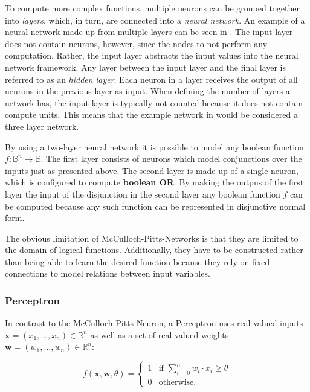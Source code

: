 To compute more complex functions, multiple neurons can be grouped together into \textit{layers}, which, in turn, are connected into a \textit{neural network}.
An example of a neural network made up from multiple layers can be seen in .
The input layer does not contain neurons, however, since the nodes to not perform any computation.
Rather, the input layer abstracts the input values into the neural network framework.
Any layer between the input layer and the final layer is referred to as an \textit{hidden layer}.
Each neuron in a layer receives the output of all neurons in the previous layer as input.
When defining the number of layers a network has, the input layer is typically not counted because it does not contain compute units.
This means that the example network in  would be considered a three layer network.

By using a two-layer neural network it is possible to model any boolean function $f: \mathbb{B}^n \to \mathbb{B}$.
The first layer consists of neurons which model conjunctions over the inputs just as presented above.
The second layer is made up of a single neuron, which is configured to compute \textbf{boolean OR}.
By making the outpus of the first layer the input of the disjunction in the second layer any boolean function $f$ can be computed because any such function can be represented in disjunctive normal form.

The obvious limitation of McCulloch-Pitts-Networks is that they are limited to the domain of logical functions.
Additionally, they have to be constructed rather than being able to learn the desired function because they rely on fixed connections to model relations between input variables.

\subsubsection{Perceptron}

In contrast to the McCulloch-Pitts-Neuron, a Perceptron uses real valued inputs $\bm{x} = (x_1, \dots, x_n) \in \mathbb{R}^n$ as well as a set of real valued weights $\bm{w} = (w_1, \dots, w_n) \in \mathbb{R}^n$:

\begin{equation}
    f(\bm{x}, \bm{w}, \theta) =
    \begin{cases}
        1 & \text{if } \sum_{i=0}^n w_i \cdot x_i \geq \theta \\
        0 & \text{otherwise.}
    \end{cases}
\end{equation}

